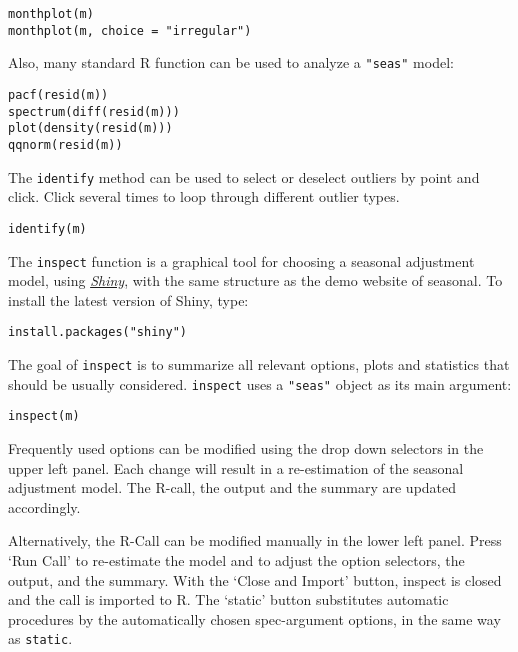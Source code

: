 \begin{verbatim}
monthplot(m)
monthplot(m, choice = "irregular")
\end{verbatim}

Also, many standard R function can be used to analyze a \texttt{"seas"}
model:

\begin{verbatim}
pacf(resid(m))
spectrum(diff(resid(m)))
plot(density(resid(m)))
qqnorm(resid(m))
\end{verbatim}

The \texttt{identify} method can be used to select or deselect outliers
by point and click. Click several times to loop through different
outlier types.

\begin{verbatim}
identify(m)
\end{verbatim}


The \texttt{inspect} function is a graphical tool for choosing a
seasonal adjustment model, using
\emph{\href{http://shiny.rstudio.com}{Shiny}}, with the same structure
as the demo website of seasonal. To install the latest version of Shiny,
type:

\begin{verbatim}
install.packages("shiny")
\end{verbatim}

The goal of \texttt{inspect} is to summarize all relevant options, plots
and statistics that should be usually considered. \texttt{inspect} uses
a \texttt{"seas"} object as its main argument:

\begin{verbatim}
inspect(m)
\end{verbatim}

Frequently used options can be modified using the drop down selectors in
the upper left panel. Each change will result in a re-estimation of the
seasonal adjustment model. The R-call, the output and the summary are
updated accordingly.

Alternatively, the R-Call can be modified manually in the lower left
panel. Press `Run Call' to re-estimate the model and to adjust the
option selectors, the output, and the summary. With the `Close and
Import' button, inspect is closed and the call is imported to R. The
`static' button substitutes automatic procedures by the automatically
chosen spec-argument options, in the same way as \texttt{static}.

